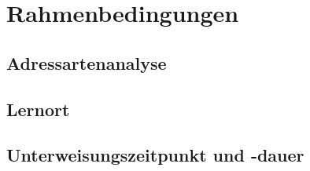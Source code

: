 \chapter{Rahmenbedingungen}

\section{Adressartenanalyse}

\section{Lernort}

\section{Unterweisungszeitpunkt und -dauer}


